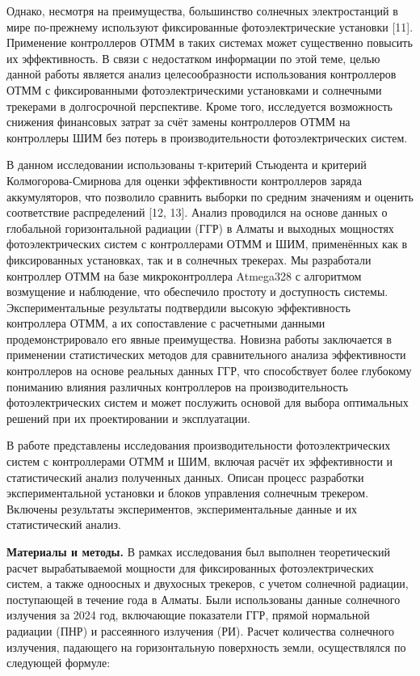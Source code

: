 \begin{multicols}{2}
Однако, несмотря на преимущества, большинство солнечных электростанций в
мире по-прежнему используют фиксированные фотоэлектрические установки
{[}11{]}. Применение контроллеров ОТММ в таких системах может
существенно повысить их эффективность. В связи с недостатком информации
по этой теме, целью данной работы является анализ целесообразности
использования контроллеров ОТММ с фиксированными фотоэлектрическими
установками и солнечными трекерами в долгосрочной перспективе. Кроме
того, исследуется возможность снижения финансовых затрат за счёт замены
контроллеров ОТММ на контроллеры ШИМ без потерь в производительности
фотоэлектрических систем.

В данном исследовании использованы т-критерий Стьюдента и критерий
Колмогорова-Смирнова для оценки эффективности контроллеров заряда
аккумуляторов, что позволило сравнить выборки по средним значениям и
оценить соответствие распределений {[}12, 13{]}. Анализ проводился на
основе данных о глобальной горизонтальной радиации (ГГР) в Алматы и
выходных мощностях фотоэлектрических систем с контроллерами ОТММ и ШИМ,
применённых как в фиксированных установках, так и в солнечных трекерах.
Мы разработали контроллер ОТММ на базе микроконтроллера Atmega328 с
алгоритмом возмущение и наблюдение, что обеспечило простоту и
доступность системы. Экспериментальные результаты подтвердили высокую
эффективность контроллера ОТММ, а их сопоставление с расчетными данными
продемонстрировало его явные преимущества. Новизна работы заключается в
применении статистических методов для сравнительного анализа
эффективности контроллеров на основе реальных данных ГГР, что
способствует более глубокому пониманию влияния различных контроллеров на
производительность фотоэлектрических систем и может послужить основой
для выбора оптимальных решений при их проектировании и эксплуатации.

В работе представлены исследования производительности фотоэлектрических
систем с контроллерами ОТММ и ШИМ, включая расчёт их эффективности и
статистический анализ полученных данных. Описан процесс разработки
экспериментальной установки и блоков управления солнечным трекером.
Включены результаты экспериментов, экспериментальные данные и их
статистический анализ.

{\bfseries Материалы и методы.} В рамках исследования был выполнен
теоретический расчет вырабатываемой мощности для фиксированных
фотоэлектрических систем, а также одноосных и двухосных трекеров, с
учетом солнечной радиации, поступающей в течение года в Алматы. Были
использованы данные солнечного излучения за 2024 год, включающие
показатели ГГР, прямой нормальной радиации (ПНР) и рассеянного излучения
(РИ). Расчет количества солнечного излучения, падающего на
горизонтальную поверхность земли, осуществлялся по следующей формуле:


\end{multicols}
